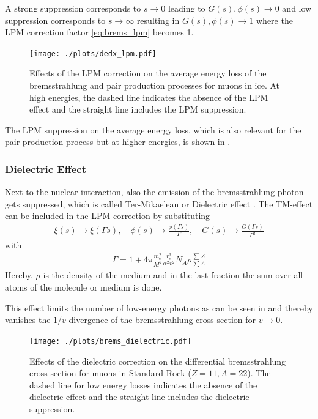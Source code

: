 A strong suppression corresponds to $s \to 0$ leading to $G(s), \phi(s) \to 0$ and low suppression corresponds to $s \to \infty$ resulting in $G(s), \phi(s) \to 1$ where the LPM correction factor \eqref{eq:brems_lpm} becomes 1.
\begin{figure}
    \centering
    \texttt{[image: ./plots/dedx\_lpm.pdf]}
    \caption{Effects of the LPM correction on the average energy loss of the bremsstrahlung and pair production processes for muons in ice. At high energies, the dashed line indicates the absence of the LPM effect and the straight line includes the LPM suppression.}
    \label{fig:dedx_lpm}
\end{figure}

The LPM suppression on the average energy loss, which is also relevant for the pair production process but at higher energies, is shown in .

\subsubsection{Dielectric Effect}

Next to the nuclear interaction, also the emission of the bremsstrahlung photon gets suppressed, which is called Ter-Mikaelean or Dielectric effect \cite{TerMikaelian54}.
The TM-effect can be included in the LPM correction by substituting
\begin{align}
    \xi(s) \to \xi(\Gamma s), \quad
    \phi(s) \to \frac{\phi(\Gamma s)}{\Gamma}, \quad
    G(s) \to \frac{G(\Gamma s)}{\Gamma^2}
\end{align}
with
\begin{align}
    \Gamma = 1 + 4\pi \frac{m_e^2}{M^2} \frac{r_e^3}{\alpha^2v^2} N_A \rho \frac{\sum Z}{\sum A}
\end{align}
Hereby, $\rho$ is the density of the medium and in the last fraction the sum over all atoms of the molecule or medium is done.

This effect limits the number of low-energy photons as can be seen in  and thereby vanishes the $1/v$ divergence of the bremsstrahlung cross-section for $v \to 0$.
\begin{figure}
    \centering
    \texttt{[image: ./plots/brems\_dielectric.pdf]}
    \caption{Effects of the dielectric correction on the differential bremsstrahlung cross-section for muons in Standard Rock ($Z=11, A=22$). The dashed line for low energy losses indicates the absence of the dielectric effect and the straight line includes the dielectric suppression.}
    \label{fig:brems_tm}
\end{figure}

